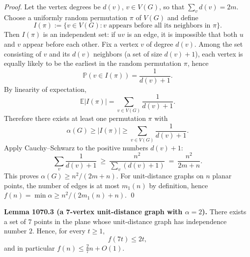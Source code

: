 \emph{Proof.}
Let the vertex degrees be $d(v)$, $v\in V(G)$, so that $\sum_{v} d(v)=2m$.
Choose a uniformly random permutation $\pi$ of $V(G)$ and define
\[
I(\pi):=\{v\in V(G): v\text{ appears before all its neighbors in }\pi\}.
\]
Then $I(\pi)$ is an independent set: if $uv$ is an edge, it is impossible that both $u$ and $v$ appear before each other.
Fix a vertex $v$ of degree $d(v)$.  Among the set consisting of $v$ and its $d(v)$ neighbors (a set of size $d(v)+1$), each vertex is equally likely to be the earliest in the random permutation $\pi$, hence
\[
\mathbb{P}(v\in I(\pi))=\frac{1}{d(v)+1}.
\]
By linearity of expectation,
\[
\mathbb{E}|I(\pi)|=\sum_{v\in V(G)} \frac{1}{d(v)+1}.
\]
Therefore there exists at least one permutation $\pi$ with
\[
\alpha(G)\ge |I(\pi)|\ge \sum_{v\in V(G)} \frac{1}{d(v)+1}.
\]
Apply Cauchy--Schwarz to the positive numbers $d(v)+1$:
\[
\sum_{v} \frac{1}{d(v)+1}
\ \ge\ \frac{n^2}{\sum_v (d(v)+1)}
\ =\ \frac{n^2}{2m+n}.
\]
This proves $\alpha(G)\ge n^2/(2m+n)$.
For unit-distance graphs on $n$ planar points, the number of edges is at most $m_1(n)$ by definition, hence $f(n)=\min \alpha\ge n^2/(2m_1(n)+n)$.
\qed

\textbf{Lemma 1070.3 (a 7-vertex unit-distance graph with $\alpha=2$).}
There exists a set of $7$ points in the plane whose unit-distance graph has independence number $2$.
Hence, for every $t\ge 1$,
\[
 f(7t)\le 2t,
\]
and in particular $f(n)\le \frac{2}{7}n + O(1)$.

